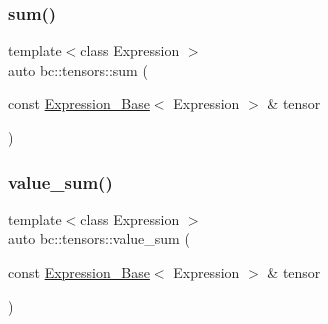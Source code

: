 \mbox{\label{namespacebc_1_1tensors_ab1c0098cd07860d0dd6e123553fa9816}} 
\subsubsection{\texorpdfstring{sum()}{sum()}}
{\footnotesize\ttfamily template$<$class Expression $>$ \\
auto bc\+::tensors\+::sum (\begin{DoxyParamCaption}\item[{const \hyperlink{classbc_1_1tensors_1_1Expression__Base}{Expression\+\_\+\+Base}$<$ Expression $>$ \&}]{tensor }\end{DoxyParamCaption})}

\mbox{\label{namespacebc_1_1tensors_a7fe17de15a2dbdb35c53c2096415b10c}} 
\subsubsection{\texorpdfstring{value\+\_\+sum()}{value\_sum()}}
{\footnotesize\ttfamily template$<$class Expression $>$ \\
auto bc\+::tensors\+::value\+\_\+sum (\begin{DoxyParamCaption}\item[{const \hyperlink{classbc_1_1tensors_1_1Expression__Base}{Expression\+\_\+\+Base}$<$ Expression $>$ \&}]{tensor }\end{DoxyParamCaption})}

